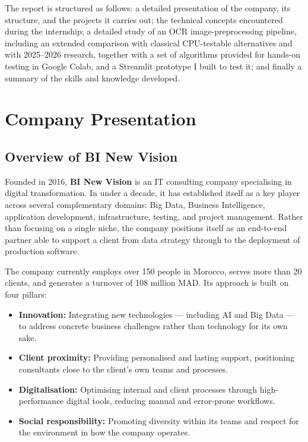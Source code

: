 \documentclass[12pt, a4paper]{article}
\begin{document}
The report is structured as follows: a detailed presentation of the company, its structure, and the projects it carries out; the technical concepts encountered during the internship; a detailed study of an OCR image-preprocessing pipeline, including an extended comparison with classical CPU-testable alternatives and with 2025--2026 research, together with a set of algorithms provided for hands-on testing in Google Colab, and a Streamlit prototype I built to test it; and finally a summary of the skills and knowledge developed.

\section{\color{navyblue} Company Presentation}

\subsection{Overview of BI New Vision}

Founded in 2016, \textbf{BI New Vision} is an IT consulting company specialising in digital transformation. In under a decade, it has established itself as a key player across several complementary domains: Big Data, Business Intelligence, application development, infrastructure, testing, and project management. Rather than focusing on a single niche, the company positions itself as an end-to-end partner able to support a client from data strategy through to the deployment of production software.

The company currently employs over 150 people in Morocco, serves more than 20 clients, and generates a turnover of 108 million MAD. Its approach is built on four pillars:

\begin{itemize}
  \item \textbf{Innovation:} Integrating new technologies --- including AI and Big Data --- to address concrete business challenges rather than technology for its own sake.
  \item \textbf{Client proximity:} Providing personalised and lasting support, positioning consultants close to the client's own teams and processes.
  \item \textbf{Digitalisation:} Optimising internal and client processes through high-performance digital tools, reducing manual and error-prone workflows.
  \item \textbf{Social responsibility:} Promoting diversity within its teams and respect for the environment in how the company operates.
\end{itemize}
\end{document}
